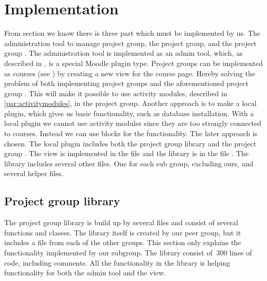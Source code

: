 \chapter{Implementation}
\label{chap:implementation}
From section  we know there is three part which must be implemented by us. 
The administration tool to manage project group, the project group, and the project group \viewroom. 
The administration tool is implemented as an admin tool, which, as described in , is a special Moodle plugin type. 
Project groups can be implemented as courses (see ) by creating a new view for the course page. 
Hereby solving the problem of both implementing project groups and the aforementioned project group \viewroom.
This will make it possible to use activity modules, described in \ref{par:activitymodules}, in the project group. 
Another approach is to make a local plugin, which gives us basic functionality, such as database installation. 
With a local plugin we cannot use activity modules since they are too strongly connected to courses. 
Instead we can use blocks for the functionality. 
The later approach is chosen. 
The local plugin includes both the project group library and the project group  \viewroom. 
The view is implemented in the file  and  the library is in the file . 
The library includes several other files.%
One for each sub group, excluding ours, and several helper files. 


\section{Project group library}
\label{sec:pglib}
The project group library is build up by several files and consist of several functions and classes.
The library itself is created by our peer group, but it includes a file from each of the other groups. 
This section only explains the functionality implemented by our subgroup. 
The library consist of $~300$ lines of code, including comments. 
All the functionality in the library is helping functionality for both the admin tool and the view. 

